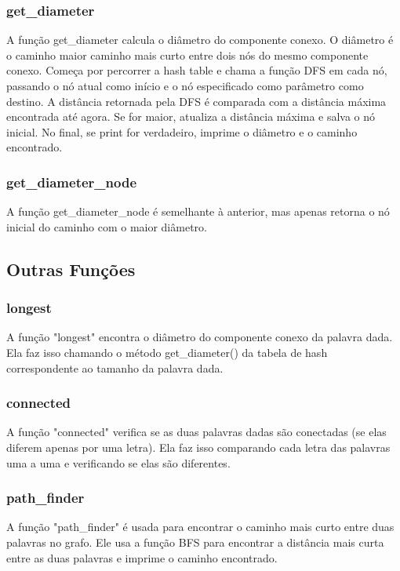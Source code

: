 \documentclass[a4paper,11pt]{article}
\begin{document}
    \subsubsection{get\_diameter}
    A função get\_diameter calcula o diâmetro do componente conexo. O diâmetro é o caminho maior caminho mais curto entre dois nós do mesmo componente conexo. Começa por percorrer a hash table e chama a função DFS em cada nó, passando o nó atual como início e o nó especificado como parâmetro como destino. A distância retornada pela DFS é comparada com a distância máxima encontrada até agora. Se for maior, atualiza a distância máxima e salva o nó inicial. No final, se print for verdadeiro, imprime o diâmetro e o caminho encontrado.
    
    \subsubsection{get\_diameter\_node}
    A função get\_diameter\_node é semelhante à anterior, mas apenas retorna o nó inicial do caminho com o maior diâmetro.
    

    \subsection{Outras Funções}\label{subsec:outras-funcoes}

    \subsubsection{longest}
    A função "longest" encontra o diâmetro do componente conexo da palavra dada. Ela faz isso chamando o método get\_diameter() da tabela de hash correspondente ao tamanho da palavra dada.
    
    \subsubsection{connected}
    A função "connected" verifica se as duas palavras dadas são conectadas (se elas diferem apenas por uma letra). Ela faz isso comparando cada letra das palavras uma a uma e verificando se elas são diferentes.
    
    \subsubsection{path\_finder}
    A função "path\_finder" é usada para encontrar o caminho mais curto entre duas palavras no grafo. Ele usa a função BFS para encontrar a distância mais curta entre as duas palavras e imprime o caminho encontrado.
    
\end{document}
